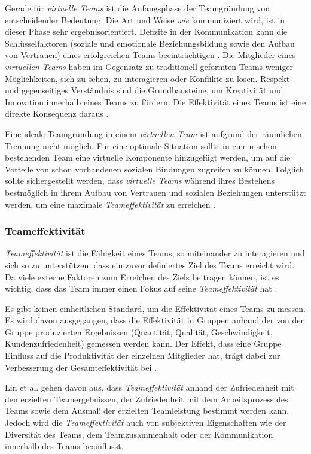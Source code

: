 \documentclass[a4paper,11pt]{article}%
\renewcommand{\\}{\vspace*{0.5\baselineskip} \newline}
\begin{document}
Gerade für \textit{virtuelle Teams} ist die Anfangsphase der Teamgründung von entscheidender Bedeutung. 
Die Art und Weise \textit{wie} kommuniziert wird, ist in dieser Phase sehr ergebnisorientiert. Defizite in der Kommunikation kann die Schlüsselfaktoren (soziale und emotionale Beziehungsbildung sowie den Aufbau von Vertrauen) eines erfolgreichen Teams beeinträchtigen \citep[S. 378]{ren2007applying}.
Die Mitglieder eines \textit{virtuellen Teams} haben im Gegensatz zu traditionell geformten Teams weniger Möglichkeiten, sich zu sehen, zu interagieren oder Konflikte zu lösen. 
Respekt und gegenseitiges Verständnis sind die Grundbausteine, um Kreativität und Innovation innerhalb eines Teams zu fördern. Die Effektivität eines Teams ist eine direkte Konsequenz daraus \citep[S. 378]{ren2007applying}.

Eine ideale Teamgründung in einem \textit{virtuellen Team} ist aufgrund der räumlichen Trennung nicht möglich. 
Für eine optimale Situation sollte in einem schon bestehenden Team eine virtuelle Komponente hinzugefügt werden, um auf die Vorteile von schon vorhandenen sozialen Bindungen zugreifen zu können. Folglich sollte sichergestellt werden, dass \textit{virtuelle Teams} während ihres Bestehens bestmöglich in ihrem Aufbau von Vertrauen und sozialen Beziehungen unterstützt werden, um eine maximale \textit{Teameffektivität} zu erreichen \citep[S. 36-37]{holton2001building}.

\subsubsection{Teameffektivität}
\label{Teameffektivität}
\textit{Teameffektivität} ist die Fähigkeit eines Teams, so miteinander zu interagieren und sich so zu unterstützen, dass ein zuvor definiertes Ziel des Teams erreicht wird. Da viele externe Faktoren zum Erreichen des Ziels beitragen können, ist es wichtig, dass das Team immer einen Fokus auf seine \textit{Teameffektivität} hat \citep[S. 557]{salas2005there}.

Es gibt keinen einheitlichen Standard, um die Effektivität eines Teams zu messen. Es wird davon ausgegangen, dass die Effektivität in Gruppen anhand der von der Gruppe produzierten Ergebnissen (Quantität, Qualität, Geschwindigkeit, Kundenzufriedenheit) gemessen werden kann. Der Effekt, dass eine Gruppe Einfluss auf die Produktivität der einzelnen Mitglieder hat, trägt dabei zur Verbesserung der Gesamteffektivität bei \citep[S. 309]{guzzo1996teams}.

Lin et al. \citep{lin2008model} gehen davon aus, dass \textit{Teameffektivität} anhand der Zufriedenheit mit den erzielten Teamergebnissen, der Zufriedenheit mit dem Arbeitsprozess des Teams sowie dem Ausmaß der erzielten Teamleistung bestimmt werden kann.
Jedoch wird die \textit{Teameffektivität} auch von subjektiven Eigenschaften wie der Diversität des Teams, dem Teamzusammenhalt oder der Kommunikation innerhalb des Teams beeinflusst. 
\end{document}

